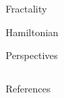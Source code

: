 \documentclass[final]{beamer}
\newlength{\sepwidth}
\newlength{\colwidth}
\newcommand{\separatorcolumn}{\begin{column}{\sepwidth}\end{column}}
\begin{document}
\begin{frame}[t]
\begin{columns}[t]
\begin{column}{\colwidth}
      \begin{block}{Fractality}

      \end{block}

      \begin{block}{Hamiltonian}



      \end{block}

      \begin{alertblock}{Perspectives}

      \end{alertblock}



    \end{column}

    \separatorcolumn
  \end{columns}

  \begin{block}{\justifying References}
    \nocite{*}
    \footnotesize{}

  \end{block}

\end{frame}
\end{document}

